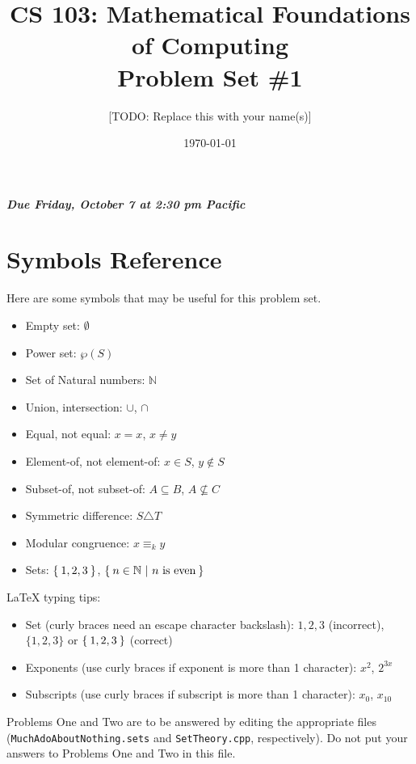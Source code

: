 \documentclass{article}
\title{CS 103: Mathematical Foundations of Computing\\Problem Set \#1}
\author{[TODO: Replace this with your name(s)]}
\date{\today}
\renewcommand{\(}{\left(}
\renewcommand{\)}{\right)}
\newcommand{\powerset}[1]{\wp\left(#1\right)}
\newcommand{\suchthat}{\ \vert \ }
\newcommand{\naturals}{\mathbb{N}}
\renewcommand{\emph}[1]{\textit{\textbf{#1}}}
\theoremstyle{plain}
\theoremstyle{plain}
\theoremstyle{definition}
\begin{document}
\maketitle

\begin{center}
\emph{Due Friday, October 7 at 2:30 pm Pacific}
\end{center}

\section*{Symbols Reference}
Here are some symbols that may be useful for this problem set.

\begin{itemize}
\item Empty set: $\emptyset$
\item Power set: $\powerset{S}$
\item Set of Natural numbers: $\naturals$
\item Union, intersection: $\cup$, $\cap$
\item Equal, not equal: $x = x$, $x \neq y$
\item Element-of, not element-of: $x \in S$, $y \not \in S$
\item Subset-of, not subset-of: $A \subseteq B$, $A \not \subseteq C$
\item Symmetric difference: $S \triangle T$
\item Modular congruence: $x \equiv_k y$
\item Sets: $\Set{1, 2, 3}$, $\Set{n \in \naturals \suchthat n \text{ is even}}$
\end{itemize}

LaTeX typing tips:
\begin{itemize}
\item Set (curly braces need an escape character backslash): ${1, 2, 3}$ (incorrect), $\{1, 2, 3\}$ or $\Set{1, 2, 3}$ (correct)
\item Exponents (use curly braces if exponent is more than 1 character): $x^2$, $2^{3x}$
\item Subscripts (use curly braces if subscript is more than 1 character): $x_0$, $x_{10}$
\end{itemize}

\pagebreak

Problems One and Two are to be answered by editing the appropriate files
(\texttt{MuchAdoAboutNothing.sets} and \texttt{SetTheory.cpp}, respectively).
Do not put your answers to Problems One and Two in this file.
\end{document}
